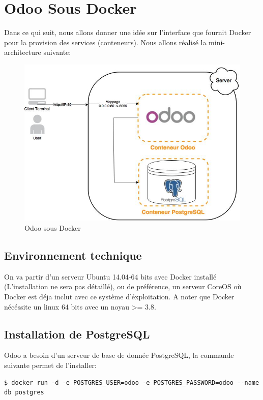 \chapter{Odoo Sous Docker}

	Dans ce qui suit, nous allons donner une idée sur l'interface que fournit Docker pour la provision des services (conteneurs). Nous allons réalisé la mini-architecture suivante:
	
	\begin{figure}[H]
	\centering
	\includegraphics [scale=0.5]{biblio/odoo.jpg}
	\caption{Odoo sous Docker}
	\label{fig:}
	\end{figure}

\section*{Environnement technique}
	
	On va partir d'un serveur Ubuntu 14.04-64 bits avec Docker installé (L'installation ne sera pas détaillé), ou de préférence, un serveur CoreOS où Docker est déja inclut avec ce système d'éxploitation. A noter que Docker nécéssite un linux 64 bits avec un noyau >= 3.8.


\section*{Installation de PostgreSQL}

	Odoo a besoin d'un serveur de base de donnée PostgreSQL, la commande suivante permet de l'installer:

	\begin{lstlisting}[caption=Installation de PostgreSQL]
		$ docker run -d -e POSTGRES_USER=odoo -e POSTGRES_PASSWORD=odoo --name db postgres
	\end{lstlisting}




